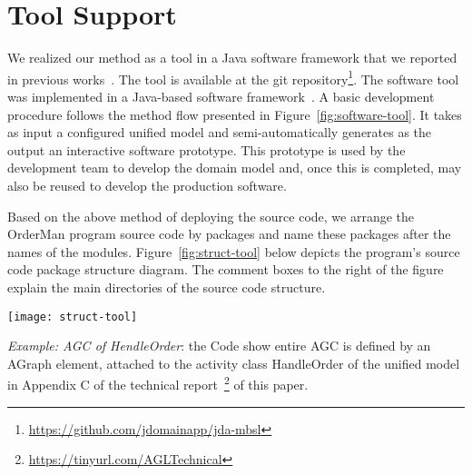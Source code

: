 \section{Tool Support}
\label{sect:tool} %
We realized our method as a tool in a Java software framework that we reported in previous works~\cite{le_domain_2018}. The tool is available at the git repository\footnote{\url{https://github.com/jdomainapp/jda-mbsl}}. The software tool was implemented in a Java-based software framework~\cite{le_jdomainapp_2017}. A basic development procedure follows the method flow presented in Figure~\ref{fig:software-tool}. It takes as input a configured unified model and semi-automatically generates as the output an interactive software prototype. This prototype is used by the development team to develop the domain model and, once this is completed, may also be reused to develop the production software.
%

Based on the above method of deploying the source code, we arrange the OrderMan program source code by packages and name these packages after the names of the modules. Figure~\ref{fig:struct-tool} below depicts the program's source code package structure diagram. The comment boxes to the right of the figure explain the main directories of the source code structure.
%
\begin{figure*}[ht]
	\centering
	\texttt{[image: struct-tool]}
	\caption{Structure diagram of the program source code OrderMan} %
	\label{fig:struct-tool}
\end{figure*}
%

\textit{Example: AGC of HendleOrder}: the Code show entire AGC is defined by an AGraph element, attached to the activity class HandleOrder of the unified model in Appendix C of the technical report~\footnote{\url{https://tinyurl.com/AGLTechnical}} of this paper.


